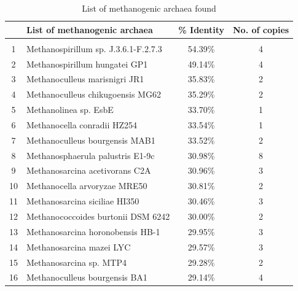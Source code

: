 \documentclass[fontsize=12pt,headsepline=true, bibliography=totocnumbered, twoside]{scrbook} %
\begin{document}
\begin{table}[]
\caption{List of methanogenic archaea found}
\vspace{0.3cm}
\begin{tabular}{clcc}
   & \textbf{List of methanogenic archaea}             & \textbf{\% Identity} & \textbf{No. of copies} \\
   \hline \\
1  & Methanospirillum sp. J.3.6.1-F.2.7.3 & 54.39\%                      & 4                         \\
2  & Methanospirillum hungatei GP1        & 49.14\%                      & 4                         \\
3  & Methanoculleus marisnigri JR1        & 35.83\%                      & 2                         \\
4  & Methanoculleus chikugoensis MG62     & 35.29\%                      & 2                         \\
5  & Methanolinea sp. EsbE                & 33.70\%                      & 1                         \\
6  & Methanocella conradii HZ254          & 33.54\%                      & 1                         \\
7  & Methanoculleus bourgensis MAB1       & 33.52\%                      & 2                         \\
8  & Methanosphaerula palustris E1-9c     & 30.98\%                      & 8                         \\
9  & Methanosarcina acetivorans C2A       & 30.96\%                      & 3                         \\
10 & Methanocella arvoryzae MRE50         & 30.81\%                      & 2                         \\
11 & Methanosarcina siciliae HI350        & 30.46\%                      & 3                         \\
12 & Methanococcoides burtonii DSM 6242   & 30.00\%                      & 2                         \\
13 & Methanosarcina horonobensis HB-1     & 29.95\%                      & 3                         \\
14 & Methanosarcina mazei LYC             & 29.57\%                      & 3                         \\
15 & Methanosarcina sp. MTP4              & 29.28\%                      & 2                         \\
16 & Methanoculleus bourgensis BA1        & 29.14\%                      & 4                         \\

\end{tabular}
\end{table}
\end{document}
